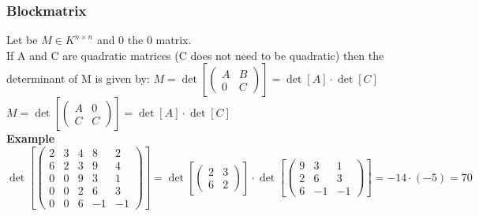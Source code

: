 \documentclass[10pt,a4paper]{article}
\begin{document}
\subsubsection{Blockmatrix}
Let be $M \in K^{n \times n}$ and 0 the 0 matrix.\\
If A and C are quadratic matrices (C does not need to be quadratic) then the determinant of M is given by:
$M = \det\left[\left(\begin{array}{cc}
A & B \\
0 & C
\end{array}\right)\right]
= \det\left[A \right] \cdot \det \left[C \right]$\\
$M = \det\left[\left(\begin{array}{cc}
A & 0 \\
C & C
\end{array}\right)\right]
= \det\left[A \right] \cdot \det \left[C \right]$\\
\textbf{Example}\\
$\det \left[ \left( \begin{array}{ccccc}
2 & 3 & 4 & 8 & 2\\
6 & 2 & 3 & 9 & 4\\
0 & 0 & 9 & 3 & 1\\
0 & 0 & 2 & 6 & 3\\
0 & 0 & 6 &-1 &-1
\end{array}  \right) \right]
= \det \left[ \left( \begin{array}{cc}
2 & 3\\
6 & 2
\end{array}   \right) \right] \cdot
\det \left[ \left( \begin{array}{ccc}
9 & 3 & 1\\
2 & 6 & 3\\
6 &-1 &-1
\end{array}  \right) \right]
=-14 \cdot (-5) = 70 
$
\end{document}
